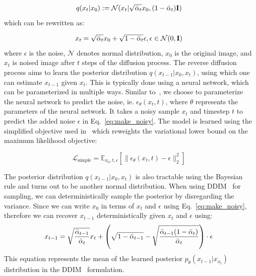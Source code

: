\begin{equation}
\label{eq:forward}
q(x_t|x_0) := \mathcal{N}(x_t|\sqrt{\Bar{\alpha}_t}x_0, (1-\Bar{\alpha}_t)\textbf{I})
\end{equation}
which can be rewritten as:


\begin{equation}
\label{eq:make_noisy}
x_t = \sqrt{\Bar{\alpha}_t}x_0 + \sqrt{1-\Bar{\alpha}_t}\epsilon, \space \epsilon \in \mathcal{N}(0, \textbf{I})
\end{equation}
where $\epsilon$ is the noise, $\mathcal{N}$ denotes normal distribution, $x_0$ is the original image, and $x_t$ is noised image after $t$ steps of the diffusion process.  
The reverse diffusion process aims to learn the posterior distribution $q(x_{t-1}|x_0,x_t)$, using which one can estimate $x_{t-1}$ given $x_t$. This is typically done using a neural network, which can be parameterized in multiple ways. Similar to~\cite{ddpm, improved-diffusion, guided-diffusion}, we choose to parameterize the neural network to predict the noise, ie. $\epsilon_\theta(x_t, t)$, where $\theta$ represents the parameters of the neural network. It takes a noisy sample $x_t$ and timestep $t$ to predict the added noise $\epsilon$ in Eq.~\ref{eq:make_noisy}. The model is learned using the simplified objective used in~\cite{ddpm} which reweights the variational lower bound on the maximum likelihood objective: 

\begin{equation}
\label{eq:L_eps}
\mathcal{L}_{\text{simple}}=\mathbb{E}_{x_0,t,\epsilon}[\|\epsilon_\theta(x_t, t) - \epsilon \|_2^2]
\end{equation}

 The posterior distribution $q(x_{t-1}|x_0,x_t)$ is also tractable using the Bayesian rule and turns out to be another normal distribution. When using DDIM~\cite{ddim} for sampling, we can deterministically sample the posterior by disregarding the variance. Since we can write $x_0$ in terms of $x_t$ and $\epsilon$ using Eq.~\ref{eq:make_noisy}, therefore we can recover $x_{t-1}$ deterministically given $x_t$ and $\epsilon$ using:
 \begin{equation}
\label{eq:remove_noise}
x_{t-1}=\sqrt{\frac{\Bar{\alpha}_{t-1}}{\Bar{\alpha}_t}}x_t + \left( \sqrt{1-\Bar{\alpha}_{t-1}} -  \sqrt{\frac{\Bar{\alpha}_{t-1}(1-\Bar{\alpha}_t)}{\Bar{\alpha}_t}}\right)\cdot \epsilon
\end{equation}
This equation represents the mean of the learned posterior $p_\theta(x_{t-1}|x_{x_t})$ distribution in the DDIM~\cite{ddim} formulation.


